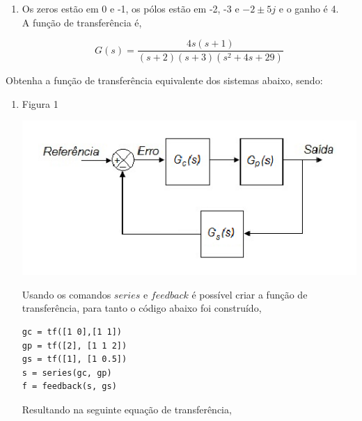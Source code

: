 \documentclass[a4paper, 10pt]{article}
\begin{document}
\begin{list}{\textbf{Questão .}}{
\setlength{\labelwidth}{-2mm} \setlength{\parsep}{0mm}
\setlength{\topsep}{0mm} \setlength{\leftmargin}{0mm}}
\begin{enumerate}
                 Usando o mesmo código usando no item a, a função de transferência fica,

                 $$
                 G(s) = \frac{s}{s^2 + 2 s + 5}
                 $$

                 

             \item
                 Os zeros estão em 0 e -1, os pólos estão em -2, -3 e 
                 $-2\pm5j$ e o ganho é 4.\\

                 A função de transferência é,

                 $$
                 G(s) = \frac{4 s (s+1)}{(s+2) (s+3) (s^2 + 4 s + 29)}
                 $$
                

        \end{enumerate}


\newpage
\item
    Obtenha a função de transferência equivalente dos sistemas abaixo, sendo:

    \begin{enumerate}
        \item
            Figura 1
            \begin{center}
            \includegraphics[scale=0.5]{fig5a.png}
            \end{center}

            Usando os comandos $series$ e $feedback$ é possível criar a função
            de transferência, para tanto o código abaixo foi construído,

            \begin{lstlisting}
gc = tf([1 0],[1 1])
gp = tf([2], [1 1 2])
gs = tf([1], [1 0.5])
s = series(gc, gp)
f = feedback(s, gs)
             \end{lstlisting}

            Resultando na seguinte equação de transferência,


\end{enumerate}
\end{list}
\end{document}

